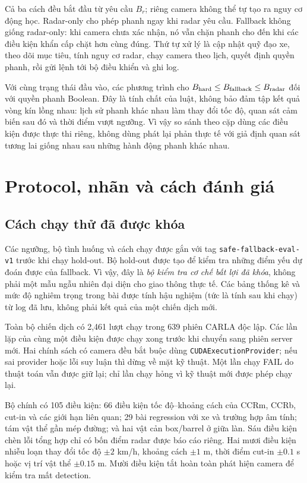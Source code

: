 \documentclass[conference]{IEEEtran}
\begin{document}
Cả ba cách đều bắt đầu từ yêu cầu $B_r$; riêng camera không thể tự tạo ra
nguy cơ động học. Radar-only cho phép phanh ngay khi radar yêu cầu. Fallback
không giống radar-only: khi camera chưa xác nhận, nó vẫn chặn phanh cho đến
khi các điều kiện khẩn cấp chặt hơn cùng đúng. Thứ tự xử lý là cập nhật quỹ
đạo xe, theo dõi mục tiêu, tính nguy cơ radar, chạy camera theo lịch, quyết
định quyền phanh, rồi gửi lệnh tới bộ điều khiển và ghi log.

Với cùng trạng thái đầu vào, các phương trình cho
$B_{\rm hard}\leq B_{\rm fallback}\leq B_{\rm radar}$ đối với quyền phanh
Boolean. Đây là tính chất của luật, không bảo đảm tập kết quả vòng kín
lồng nhau: lịch sử phanh khác nhau làm thay đổi tốc độ, quan sát cảm biến
sau đó và thời điểm vượt ngưỡng. Vì vậy so sánh theo cặp dùng các điều kiện
được thực thi riêng, không dùng phát lại phản thực tế với giả định quan sát
tương lai giống nhau sau những hành động phanh khác nhau.

\section{Protocol, nhãn và cách đánh giá}
\subsection{Cách chạy thử đã được khóa}
Các ngưỡng, bộ tình huống và cách chạy được gắn với tag
\texttt{safe-fallback-eval-v1} trước khi chạy hold-out. Bộ hold-out được tạo
để kiểm tra những điểm yếu dự đoán được của fallback. Vì vậy, đây là
\emph{bộ kiểm tra cơ chế bất lợi đã khóa}, không phải một mẫu ngẫu nhiên đại
diện cho giao thông thực tế. Các bảng thống kê và mức độ nghiêm trọng trong bài được tính hậu nghiệm
(tức là tính sau khi chạy) từ log đã lưu, không phải kết quả của một chiến dịch mới.

Toàn bộ chiến dịch có 2,461 lượt chạy trong 639 phiên CARLA độc lập. Các lần
lặp của cùng một điều kiện được chạy xong trước khi chuyển sang phiên server
mới. Hai chính sách có camera đều bắt buộc dùng
\texttt{CUDAExecutionProvider}; nếu sai provider hoặc lỗi suy luận thì dừng
về mặt kỹ thuật. Một lần chạy FAIL do thuật toán vẫn được giữ lại; chỉ lần
chạy hỏng vì kỹ thuật mới được phép chạy lại.

Bộ chính có 105 điều kiện: 66 điều kiện tốc độ--khoảng cách của CCRm, CCRb,
cut-in và các giới hạn liên quan; 29 bài regression với xe và trường hợp âm
tính; tám vật thể gần mép đường; và hai vật cản box/barrel ở giữa làn. Sáu
điều kiện chèn lỗi tổng hợp chỉ có bốn điểm radar được báo cáo riêng. Hai mươi
điều kiện nhiễu loạn thay đổi tốc độ $\pm2$ km/h, khoảng cách $\pm1$ m, thời
điểm cut-in $\pm0.1$ s hoặc vị trí vật thể $\pm0.15$ m. Mười điều kiện tắt
hoàn toàn phát hiện camera để kiểm tra mất detection.
\end{document}
